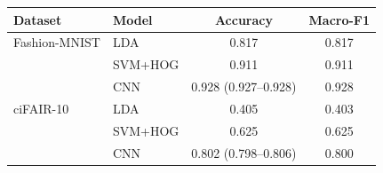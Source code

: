 \begin{tabular}{llcc}
\toprule
Dataset & Model & Accuracy & Macro-F1 \\
\midrule
Fashion-MNIST & LDA & 0.817 & 0.817 \\
 & SVM+HOG & 0.911 & 0.911 \\
 & CNN & 0.928 (0.927--0.928) & 0.928 \\
\midrule
ciFAIR-10 & LDA & 0.405 & 0.403 \\
 & SVM+HOG & 0.625 & 0.625 \\
 & CNN & 0.802 (0.798--0.806) & 0.800 \\
\bottomrule
\end{tabular}
